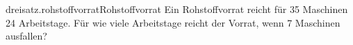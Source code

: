 \begin{exercise}{dreisatz.rohstoffvorrat}{Rohstoffvorrat}
  \ifproblem\problem
    Ein Rohstoffvorrat reicht für 35 Maschinen 24 Arbeitstage. Für wie viele
    Arbeitstage reicht der Vorrat, wenn 7 Maschinen ausfallen?
  \fi
\end{exercise}
